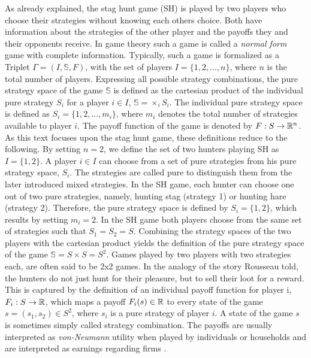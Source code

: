 \label{sec:traditional}
As already explained, the stag hunt game (SH) is played by 
two players who choose their
strategies without knowing each others choice.
Both have information about the strategies of the
other player and the payoffs they and their opponents receive. In game theory
such a game is called a \textit{normal form} game with complete information. 
Typically, such a game is formalized as a Triplet $\Gamma = (I,\mathbb{S},F)$, 
with the set of players $I=\{1,2,...,n\}$, where $n$ is the 
total number of players. 
Expressing all possible strategy combinations, the pure
strategy space of the game $\mathbb{S}$ is defined as the cartesian
product of the individual pure strategy $S_i$ for a player $i \in I$,
$\mathbb{S}=\times_i S_i$. The individual pure strategy space is defined as
$S_i = \{1,2,...,m_i\}$, where $m_i$ denotes the total 
number of strategies available to player $i$. 
The payoff 
function of the game is denoted by $F: S \rightarrow \mathbb{R}^n$.
As this text focuses upon the stag hunt game, these definitions reduce to the 
following.
By setting $n=2$, we define the set of two hunters playing SH as $I=\{1,2\}$. A 
player $i \in I$  can choose from a set of pure strategies from his 
pure strategy space, $S_i$. The strategies are called pure to distinguish
them from the later introduced mixed strategies. 
In the SH game, each hunter can choose one out of two pure strategies, namely, 
hunting stag (strategy 1) or hunting hare (strategy 2).
Therefore, the pure strategy space is defined by $S_i = \{1,2\}$, which results
by setting $m_i=2$. In the SH game both players choose from
the same set of strategies such that $S_1 =S_2=S$. Combining the strategy spaces
of the two players with the cartesian product
yields the definition of the pure strategy space of the game
$\mathbb{S}= S \times S = S^2$. Games played by two players with two strategies
each, are often said to be 2x2 games.    
In the analogy of the story Rousseau told, the hunters do not just hunt
for their pleasure, but to sell their loot for a reward. 
This is captured by the definition of an individual payoff function for player
i, $F_i:S \rightarrow \mathbb{R}$, which maps a payoff $F_i(s) \in \mathbb{R}$ 
to every state of the game $s=(s_1,s_2) \in S^2$, where $s_i$ is a pure
strategy of player $i$. A state of the game $s$ is sometimes simply called 
strategy combination.
The payoffs are usually interpreted as \textit{von-Neumann} utility when 
played by individuals or households and are interpreted as earnings regarding 
firms \parencite{fudenberg_theory_1998}. 

